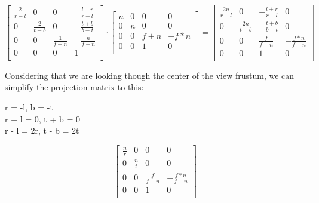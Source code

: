 \documentclass[12pt]{report} \usepackage{preamble}
\begin{document}
\[

	\begin{bmatrix}
		\frac{2}{r - l} & 0               & 0               & -\frac{l + r}{r - l} \\
		0               & \frac{2}{t - b} & 0               & -\frac{t + b}{b - t} \\
		0               & 0               & \frac{1}{f - n} & -\frac{n}{f - n}     \\
		0               & 0               & 0               & 1                    \\
	\end{bmatrix}
	\cdot
	\begin{bmatrix}
		n & 0 & 0     & 0      \\
		0 & n & 0     & 0      \\
		0 & 0 & f + n & -f * n \\
		0 & 0 & 1     & 0      \\
	\end{bmatrix}
	=
	\begin{bmatrix}
		\frac{2n}{r - l} & 0                & -\frac{l + r}{r - l} & 0                    \\
		0                & \frac{2n}{t - b} & -\frac{t + b}{b - t} & 0                    \\
		0                & 0                & \frac{f}{f - n}      & -\frac{f * n}{f - n} \\
		0                & 0                & 1                    & 0                    \\
	\end{bmatrix}
\]

Considering that we are looking though the center of the view frustum, we can
simplify the projection matrix to this:

r = -l, b = -t \\
\rightarrow r + l = 0, t + b  = 0 \\
\rightarrow r - l = 2r, t - b = 2t

\[
	\begin{bmatrix}
		\frac{n}{r} & 0           & 0               & 0                    \\
		0           & \frac{n}{t} & 0               & 0                    \\
		0           & 0           & \frac{f}{f - n} & -\frac{f * n}{f - n} \\
		0           & 0           & 1               & 0                    \\
	\end{bmatrix}
\]
\end{document}
